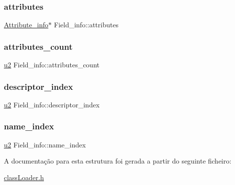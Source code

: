 \mbox{\label{struct_field__info_a82d5d1b1ba57dfc6b711072777d92894}} 
\subsubsection{\texorpdfstring{attributes}{attributes}}
{\footnotesize\ttfamily \hyperlink{struct_attribute__info}{Attribute\+\_\+info}$\ast$ Field\+\_\+info\+::attributes}

\mbox{\label{struct_field__info_a4f9e6178d09bb7ce6e32d26e5247bc55}} 
\subsubsection{\texorpdfstring{attributes\+\_\+count}{attributes\_count}}
{\footnotesize\ttfamily \hyperlink{util_8h_a55ef8d87fd202b8417704c089899c5b9}{u2} Field\+\_\+info\+::attributes\+\_\+count}

\mbox{\label{struct_field__info_a6513dda6705b584d2da444ee32ea5283}} 
\subsubsection{\texorpdfstring{descriptor\+\_\+index}{descriptor\_index}}
{\footnotesize\ttfamily \hyperlink{util_8h_a55ef8d87fd202b8417704c089899c5b9}{u2} Field\+\_\+info\+::descriptor\+\_\+index}

\mbox{\label{struct_field__info_ab08cf316ad4af84d9a6dfd12bbbdc0fc}} 
\subsubsection{\texorpdfstring{name\+\_\+index}{name\_index}}
{\footnotesize\ttfamily \hyperlink{util_8h_a55ef8d87fd202b8417704c089899c5b9}{u2} Field\+\_\+info\+::name\+\_\+index}



A documentação para esta estrutura foi gerada a partir do seguinte ficheiro\+:\begin{DoxyCompactItemize}
\item 
\hyperlink{class_loader_8h}{class\+Loader.\+h}\end{DoxyCompactItemize}
